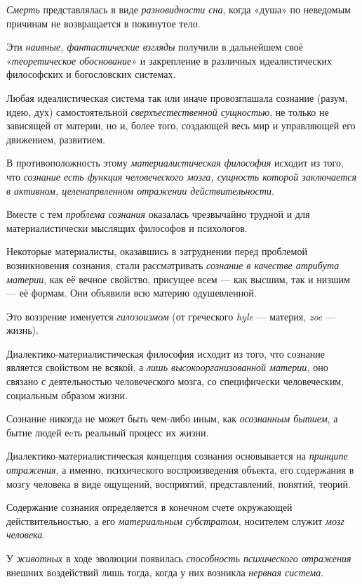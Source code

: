 \documentclass[a4paper,14pt,russian]{extreport}
\begin{document}
\emph{Смерть} представлялась в виде \emph{разновидности сна}, когда «душа» по неведомым причинам не возвращается в покинутое тело.

Эти \emph{наивные, фантастические взгляды} получили в дальнейшем своё «\emph{теоретическое обоснование}» и закрепление в различных идеалистических философских и богословских системах.

Любая идеалистическая система так или иначе провозглашала сознание (разум, идею, дух) самостоятельной \emph{сверхъестественной сущностью}, не только не зависящей от материи, но и, более того, создающей весь мир и управляющей его движением, развитием.

В противоположность этому \emph{материалистическая философия} исходит из того, что \emph{сознание есть функция человеческого мозга, сущность которой заключается в активном, целенапрвленном отражении действительности}.

Вместе с тем \emph{проблема сознания} оказалась чрезвычайно трудной и для материалистически мыслящих философов и психологов.

Некоторые материалисты, оказавшись в затруднении перед проблемой возникновения сознания, стали рассматривать \emph{сознание в качестве атрибута материи}, как её вечное свойство, присущее всем --- как высшим, так и низшим --- её формам. Они объявили всю материю одушевленной.

Это воззрение именуется \emph{гилозоизмом} (от греческого \emph{hyle} --- материя, \emph{zoe} --- жизнь).

Диалектико-материалистическая философия исходит из того, что сознание является свойством не всякой, а \emph{лишь высокоорганизованной материи,} оно связано с деятельностью человеческого мозга, со специфически человеческим, социальным образом жизни.

Сознание никогда не может быть чем-либо иным, как \emph{осознанным бытием}, а бытие людей еcть реальный процесс их жизни.

Диалектико-материалистическая концепция сознания основывается на \emph{принципе отражения}, а именно, психического воспроизведения объекта, его содержания в мозгу человека в виде ощущений, восприятий, представлений, понятий, теорий.

Содержание сознания определяется в конечном счете окружающей действительностью, а его \emph{материальным субстратом}, носителем служит \emph{мозг человека}.

У \emph{животных} в ходе эволюции появилась \emph{способность психического отражения} внешних воздействий лишь тогда, когда у них возникла \emph{нервная система}.
\end{document}
